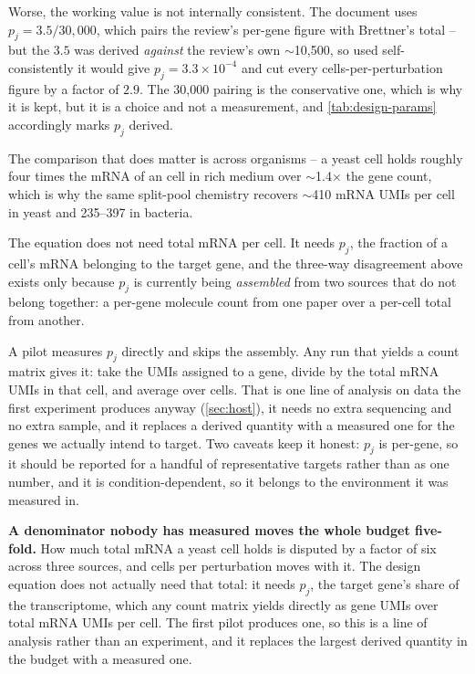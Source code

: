 Worse, the working value is not internally consistent. The document uses
$p_j = 3.5/30{,}000$, which pairs the review's per-gene figure with Brettner's
total -- but the $3.5$ was derived \emph{against} the review's own
$\sim$10{,}500, so used self-consistently it would give $p_j=3.3\times10^{-4}$
and cut every cells-per-perturbation figure by a factor of $2.9$. The 30{,}000
pairing is the conservative one, which is why it is kept, but it is a choice and
not a measurement, and \cref{tab:design-params} accordingly marks $p_j$ derived.

The comparison that does matter is across organisms -- a yeast cell
holds roughly four times the mRNA of an  cell in rich medium over
$\sim$1.4$\times$ the gene count, which is why the same split-pool chemistry
recovers $\sim$410 mRNA UMIs per cell in yeast and 235--397 in bacteria.

 The equation does not need total mRNA
per cell. It needs $p_j$, the fraction of a cell's mRNA belonging to the target
gene, and the three-way disagreement above exists only because $p_j$ is
currently being \emph{assembled} from two sources that do not belong together: a
per-gene molecule count from one paper over a per-cell total from another.

A pilot measures $p_j$ directly and skips the assembly. Any run that yields a
count matrix gives it: take the UMIs assigned to a gene, divide by the total mRNA
UMIs in that cell, and average over cells. That is one line of analysis on data
the first experiment produces anyway (\cref{sec:host}), it needs no extra
sequencing and no extra sample, and it replaces a derived quantity with a
measured one for the genes we actually intend to target. Two caveats keep it
honest: $p_j$ is per-gene, so it should be reported for a handful of
representative targets rather than as one number, and it is condition-dependent,
so it belongs to the environment it was measured in.

\begin{keybox}
\textbf{A denominator nobody has measured moves the whole budget five-fold.}
How much total mRNA a yeast cell holds is disputed by a factor of six across
three sources, and cells per perturbation moves with it. The design equation
does not actually need that total: it needs $p_j$, the target gene's share of
the transcriptome, which any count matrix yields directly as gene UMIs over
total mRNA UMIs per cell. The first pilot produces one, so this is a line of
analysis rather than an experiment, and it replaces the largest derived quantity
in the budget with a measured one.
\end{keybox}

